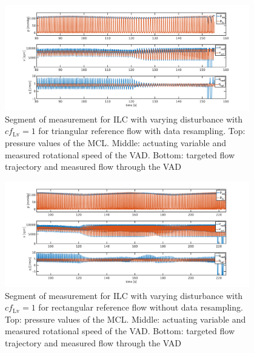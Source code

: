 \begin{figure}[ht!]
  \centering
  \includegraphics[width=0.95\textwidth]{images/chapt_5/ILC/ilc_var_dist_fix_triang.pdf}
  \caption[Segment of measurement for ILC with varying disturbance with $cf_{\mathrm{Lv}}=1$ for triangular reference flow with data resampling]{Segment of measurement for ILC with varying disturbance with $cf_{\mathrm{Lv}}=1$ for triangular reference flow with data resampling. Top:  pressure values of the MCL. Middle: actuating variable and measured rotational speed of the VAD. Bottom: targeted flow trajectory and measured flow through the VAD}
   \label{fig:anh_12}
\end{figure}

\begin{figure}[ht!]
  \centering
  \includegraphics[width=0.95\textwidth]{images/chapt_5/ILC/ilc_var_dist_unfix_rect.pdf}
  \caption[Segment of measurement for ILC with varying disturbance with $cf_{\mathrm{Lv}}=1$ for rectangular reference flow without data resampling]{Segment of measurement for ILC with varying disturbance with $cf_{\mathrm{Lv}}=1$ for rectangular reference flow without data resampling. Top:  pressure values of the MCL. Middle: actuating variable and measured rotational speed of the VAD. Bottom: targeted flow trajectory and measured flow through the VAD}
   \label{fig:anh_13}
\end{figure}

